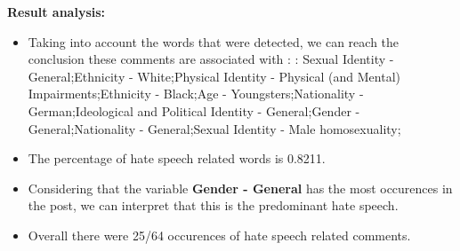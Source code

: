 \documentclass[11pt]{article}
\begin{document}
\textbf{\Large Result analysis:}

\begin{itemize}\item Taking into account the words that were detected, we can reach the conclusion these comments are associated with : : Sexual Identity - General;Ethnicity - White;Physical Identity - Physical (and Mental) Impairments;Ethnicity - Black;Age - Youngsters;Nationality - German;Ideological and Political Identity - General;Gender - General;Nationality - General;Sexual Identity - Male homosexuality;%

\item The percentage of hate speech related words is 0.8211.

\item Considering that the variable \textbf{Gender - General} has the most occurences in the post, we can interpret that this is the predominant hate speech.

\item Overall there were 25/64 occurences of hate speech related comments.\end{itemize}
\end{document}

